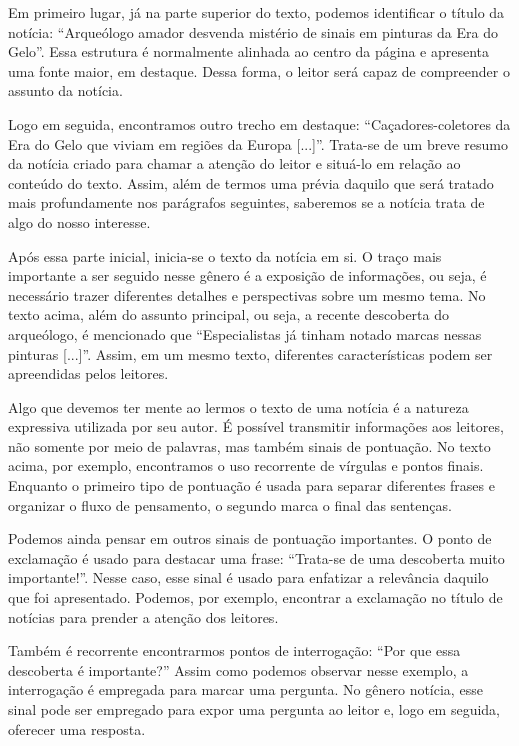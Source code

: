 Em primeiro lugar, já na parte superior do texto, podemos identificar o
título da notícia: ``Arqueólogo amador desvenda mistério de sinais em
pinturas da Era do Gelo''. Essa estrutura é normalmente alinhada ao
centro da página e apresenta uma fonte maior, em destaque. Dessa forma,
o leitor será capaz de compreender o assunto da notícia.

Logo em seguida, encontramos outro trecho em destaque:
``Caçadores-coletores da Era do Gelo que viviam em regiões da Europa
{[}...{]}''. Trata-se de um breve resumo da notícia criado para chamar a
atenção do leitor e situá-lo em relação ao conteúdo do texto. Assim,
além de termos uma prévia daquilo que será tratado mais profundamente
nos parágrafos seguintes, saberemos se a notícia trata de algo do nosso
interesse.

Após essa parte inicial, inicia-se o texto da notícia em si. O traço
mais importante a ser seguido nesse gênero é a exposição de informações,
ou seja, é necessário trazer diferentes detalhes e perspectivas sobre um
mesmo tema. No texto acima, além do assunto principal, ou seja, a
recente descoberta do arqueólogo, é mencionado que ``Especialistas já
tinham notado marcas nessas pinturas {[}...{]}''. Assim, em um mesmo
texto, diferentes características podem ser apreendidas pelos leitores.

Algo que devemos ter mente ao lermos o texto de uma notícia é a natureza
expressiva utilizada por seu autor. É possível transmitir informações
aos leitores, não somente por meio de palavras, mas também sinais de
pontuação. No texto acima, por exemplo, encontramos o uso recorrente de
vírgulas e pontos finais. Enquanto o primeiro tipo de pontuação é usada
para separar diferentes frases e organizar o fluxo de pensamento, o
segundo marca o final das sentenças.

Podemos ainda pensar em outros sinais de pontuação importantes. O ponto
de exclamação é usado para destacar uma frase: ``Trata-se de uma
descoberta muito importante!''. Nesse caso, esse sinal é usado para
enfatizar a relevância daquilo que foi apresentado. Podemos, por
exemplo, encontrar a exclamação no título de notícias para prender a
atenção dos leitores.

Também é recorrente encontrarmos pontos de interrogação: ``Por que essa
descoberta é importante?'' Assim como podemos observar nesse exemplo, a
interrogação é empregada para marcar uma pergunta. No gênero notícia,
esse sinal pode ser empregado para expor uma pergunta ao leitor e, logo
em seguida, oferecer uma resposta.

